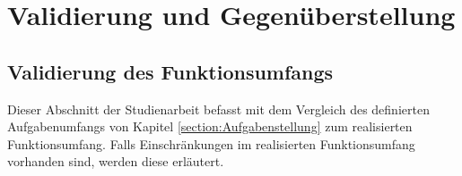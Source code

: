 
\chapter{Validierung und Gegenüberstellung}


\section{Validierung des Funktionsumfangs}

Dieser Abschnitt der Studienarbeit befasst mit dem Vergleich des definierten Aufgabenumfangs von Kapitel \ref{section:Aufgabenstellung} zum realisierten Funktionsumfang. Falls Einschränkungen im realisierten Funktionsumfang vorhanden sind, werden diese erläutert.

